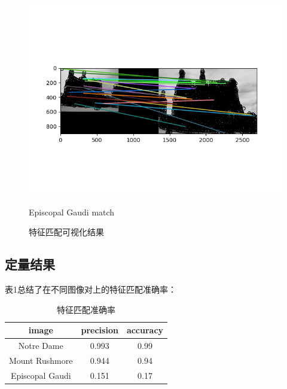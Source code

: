 \begin{figure}[h!]
\begin{minipage}[b]{0.3\textwidth}
        \includegraphics[width=\textwidth]{imgs/e_gaudi3.png}
        \caption{Episcopal Gaudi match}
    \end{minipage}
    \caption{特征匹配可视化结果}
    \label{图1：}
\end{figure}

\subsection{定量结果}
表1总结了在不同图像对上的特征匹配准确率：
\begin{table}[h!]
    \centering
    \caption{特征匹配准确率}
    \label{tab:accuracy}
    \begin{tabular}{ccc}
    \toprule
    \textbf{image} & \textbf{precision} & \textbf{accuracy}\\
    \midrule
    Notre Dame & 0.993&  0.99\\
    Mount Rushmore & 0.944&  0.94\\
    Episcopal Gaudi & 0.151&  0.17\\
    \bottomrule
    \end{tabular}
\end{table}